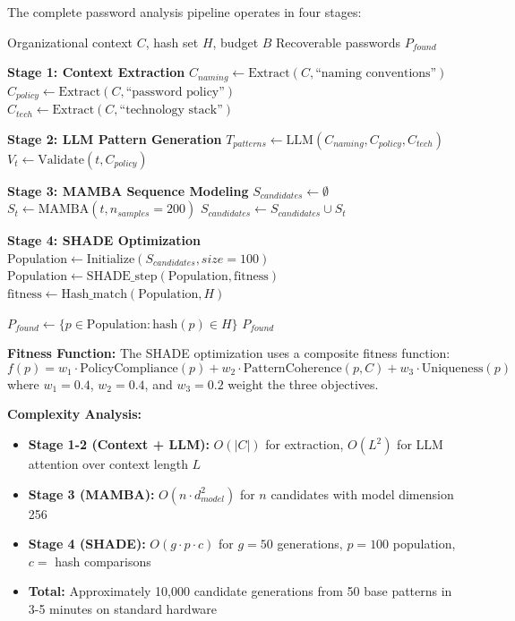 \documentclass[preprint,12pt]{elsarticle}
\begin{document}
The complete password analysis pipeline operates in four stages:

\begin{algorithm}[H]
\caption{LLM-Guided Password Generation}
\label{alg:password}
\begin{algorithmic}[1]
\REQUIRE Organizational context $C$, hash set $H$, budget $B$
\ENSURE Recoverable passwords $P_{found}$

\STATE \textbf{Stage 1: Context Extraction}
\STATE $C_{naming} \gets \text{Extract}(C, \text{``naming conventions''})$
\STATE $C_{policy} \gets \text{Extract}(C, \text{``password policy''})$
\STATE $C_{tech} \gets \text{Extract}(C, \text{``technology stack''})$

\STATE \textbf{Stage 2: LLM Pattern Generation}
\STATE $T_{patterns} \gets \text{LLM}(C_{naming}, C_{policy}, C_{tech})$
\STATE {}
    \STATE $V_t \gets \text{Validate}(t, C_{policy})$ 
\ENDFOR

\STATE \textbf{Stage 3: MAMBA Sequence Modeling}
\STATE $S_{candidates} \gets \emptyset$
    \STATE $S_t \gets \text{MAMBA}(t, n_{samples}=200)$
    \STATE $S_{candidates} \gets S_{candidates} \cup S_t$
\ENDFOR

\STATE \textbf{Stage 4: SHADE Optimization}
\STATE $\text{Population} \gets \text{Initialize}(S_{candidates}, size=100)$
    \STATE $\text{Population} \gets \text{SHADE\_step}(\text{Population}, \text{fitness})$
    \STATE $\text{fitness} \gets \text{Hash\_match}(\text{Population}, H)$
\ENDFOR

\STATE $P_{found} \gets \{p \in \text{Population} : \text{hash}(p) \in H\}$
\RETURN $P_{found}$
\end{algorithmic}
\end{algorithm}

\textbf{Fitness Function:} The SHADE optimization uses a composite fitness function:
\begin{equation}
f(p) = w_1 \cdot \text{PolicyCompliance}(p) + w_2 \cdot \text{PatternCoherence}(p, C) + w_3 \cdot \text{Uniqueness}(p)
\end{equation}
where $w_1 = 0.4$, $w_2 = 0.4$, and $w_3 = 0.2$ weight the three objectives.

\textbf{Complexity Analysis:}
\begin{itemize}
    \item \textbf{Stage 1-2 (Context + LLM):} $O(|C|)$ for extraction, $O(L^2)$ for LLM attention over context length $L$
    \item \textbf{Stage 3 (MAMBA):} $O(n \cdot d_{model}^2)$ for $n$ candidates with model dimension 256
    \item \textbf{Stage 4 (SHADE):} $O(g \cdot p \cdot c)$ for $g=50$ generations, $p=100$ population, $c=$ hash comparisons
    \item \textbf{Total:} Approximately 10,000 candidate generations from 50 base patterns in 3-5 minutes on standard hardware
\end{itemize}
\end{document}
